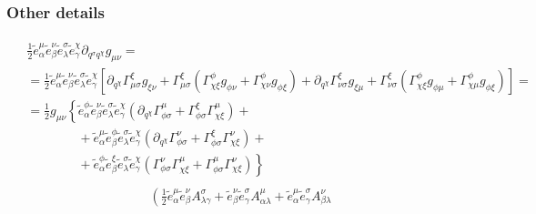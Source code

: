 \documentclass[letterpaper,10pt,english]{jupyterBook}
\begin{document}
\subsubsection*{Other details}
\begin{equation*}
\begin{split}\begin{aligned}
 & \frac{1}{2} \widetilde{e}^{\mu}_{\alpha} \widetilde{e}^{\nu}_{\beta} \widetilde{e}^{\sigma}_{\lambda} \widetilde{e}^{\chi}_{\gamma} \partial_{q^{\sigma} q^{\chi}} g_{\mu \nu} = \\
 & = \frac{1}{2} \widetilde{e}^{\mu}_{\alpha} \widetilde{e}^{\nu}_{\beta} \widetilde{e}^{\sigma}_{\lambda} \widetilde{e}^{\chi}_{\gamma} \left[ \partial_{q^\chi} \Gamma^{\xi}_{\mu \sigma} g_{\xi \nu} + \Gamma^{\xi}_{\mu \sigma} \left( \Gamma^{\phi}_{\chi\xi} g_{\phi \nu} + \Gamma^{\phi}_{\chi\nu} g_{\phi \xi} \right) + \partial_{q^\chi} \Gamma^{\xi}_{\nu \sigma} g_{\xi \mu} + \Gamma^{\xi}_{\nu \sigma} \left( \Gamma^{\phi}_{\chi\xi} g_{\phi \mu} + \Gamma^{\phi}_{\chi\mu} g_{\phi \xi} \right) \right] = \\
 & = \frac{1}{2} g_{\mu \nu} \left\{ \widetilde{e}^{\phi}_{\alpha} \widetilde{e}^{\nu}_{\beta} \widetilde{e}^{\sigma}_{\lambda} \widetilde{e}^{\chi}_{\gamma} \left( \partial_{q^\chi} \Gamma^{\mu}_{\phi \sigma} + \Gamma^{\xi}_{\phi \sigma} \Gamma^{\mu}_{\chi\xi} \right) \right. + \\ 
 & \qquad \qquad + \widetilde{e}^{\mu}_{\alpha} \widetilde{e}^{\phi}_{\beta} \widetilde{e}^{\sigma}_{\lambda} \widetilde{e}^{\chi}_{\gamma} \left( \partial_{q^\chi} \Gamma^{\nu}_{\phi \sigma} + \Gamma^{\xi}_{\phi \sigma} \Gamma^{\nu}_{\chi\xi} \right) + \\
 & \qquad \qquad + \left. \widetilde{e}^{\phi}_{\alpha} \widetilde{e}^{\xi}_{\beta} \widetilde{e}^{\sigma}_{\lambda} \widetilde{e}^{\chi}_{\gamma}  \left( \Gamma^{\nu}_{\phi \sigma} \Gamma^{\mu}_{\chi \xi} + \Gamma^{\mu}_{\phi \sigma} \Gamma^{\nu}_{\chi \xi} \right) \right\}
\end{aligned}\end{split}
\end{equation*}\begin{equation*}
\begin{split}\begin{aligned}
 & \left(
   \frac{1}{2}\widetilde{e}^{\mu}_{\alpha} \widetilde{e}^{\nu}_{\beta} A^{\sigma}_{\lambda \gamma} + 
   \widetilde{e}^{\nu}_{\beta} \widetilde{e}^{\sigma}_{\gamma} A^{\mu}_{\alpha \lambda} +
   \widetilde{e}^{\mu}_{\alpha} \widetilde{e}^{\sigma}_{\gamma} A^{\nu}_{\beta \lambda}   

\end{aligned}
\end{split}
\end{equation*}
\end{document}
